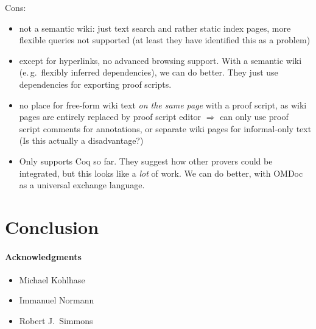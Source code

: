 \documentclass{llncs}
\begin{document}
\begin{todo}
  Cons:
  \begin{itemize}
  \item not a semantic wiki: just text search and rather static index pages, more flexible
    queries not supported (at least they have identified this as a problem)
  \item except for hyperlinks, no advanced browsing support.  With a semantic wiki
    (e.\,g.\ flexibly inferred dependencies), we can do better.  They just use
    dependencies for exporting proof scripts.
  \item no place for free-form wiki text \emph{on the same page} with a proof script, as
    wiki pages are entirely replaced by proof script editor $\Rightarrow$ can only use
    proof script comments for annotations, or separate wiki pages for informal-only text
    (Is this actually a disadvantage?)
  \item Only supports Coq so far.  They suggest how other provers could be integrated, but
    this looks like a \emph{lot} of work.  We can do better, with OMDoc as a universal
    exchange language.
  \end{itemize}
\end{todo}

\section{Conclusion}
\label{sec:conc}


\paragraph{Acknowledgments}
\label{sec:ack}

\begin{itemize}
\item Michael Kohlhase
\item Immanuel Normann
\item Robert J.\ Simmons
\end{itemize}





\ednotemessage
\end{document}
